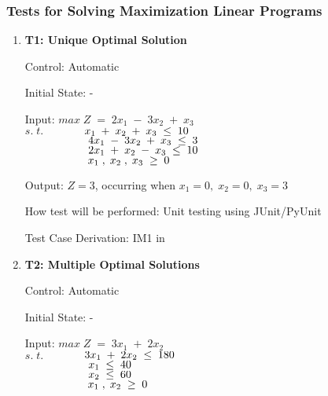 \documentclass[12pt, titlepage]{article}
\begin{document}
\subsubsection{Tests for Solving Maximization Linear Programs}


\begin{enumerate}
	\item{\textbf{T1: Unique Optimal Solution}}
	
	Control: Automatic 
	
	Initial State: -
	
	Input: $max\;Z\;=\;2x_1\;-\;3x_2\;+\;x_3$\\
	$s.\;t.$$\hspace*{1.3cm} x_1\;+\;x_2\;+\;x_3\; \leq \;10$\\
	$\hspace*{2cm} 4x_1\;-\;3x_2\;+\;x_3\; \leq \;3$\\
	$\hspace*{2cm} 2x_1\;+\;x_2\;-\;x_3\; \leq \;10$\\
	$\hspace*{2cm} x_1\;,\;x_2\;,\;x_3\; \geq \;0$
	
	Output: $Z = 3$, occurring when $x_1=0,\;x_2=0,\;x_3=3$
	
	How test will be performed: Unit testing using JUnit/PyUnit
	
	Test Case Derivation: IM1 in \cite{losms-ca} 

	\item{\textbf{T2: Multiple Optimal Solutions}}
	
	Control: Automatic 
	
	Initial State: -
	
	Input: $max\;Z\;=\;3x_1\;+\;2x_2$\\
	$s.\;t.$$\hspace*{1.3cm} 3x_1\;+\;2x_2\; \leq \;180$\\
	$\hspace*{2cm} x_1\; \leq \;40$\\
	$\hspace*{2cm} x_2\; \leq \;60$\\
	$\hspace*{2cm} x_1\;,\;x_2\; \geq \;0$
	

\end{enumerate}
\end{document}
